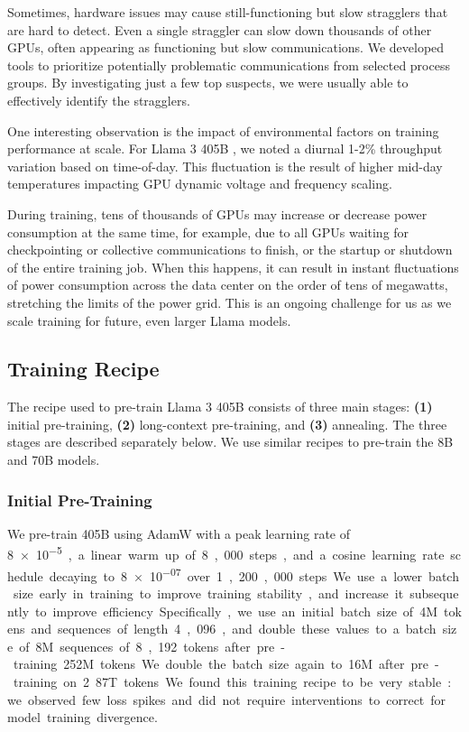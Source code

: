 \documentclass[dvipsnames]{fairmeta}
\begin{document}
Sometimes, hardware issues may cause still-functioning but slow stragglers that are hard to detect. Even a single straggler can slow down thousands of other GPUs, often appearing as functioning but slow communications. We developed tools to prioritize potentially problematic communications from selected process groups. By investigating just a few top suspects,  we were usually able to effectively identify the stragglers.

One interesting observation is the impact of environmental factors on training performance at scale. For Llama 3 405B , we noted a diurnal 1-2\% throughput variation based on time-of-day. This fluctuation is the result of higher mid-day temperatures impacting GPU dynamic voltage and frequency scaling.

During training, tens of thousands of GPUs may increase or decrease power consumption at the same time, for example, due to all GPUs waiting for checkpointing or collective communications to finish, or the startup or shutdown of the entire training job. When this happens, it can result in instant fluctuations of power consumption across the data center on the order of tens of megawatts, stretching the limits of the power grid. This is an ongoing challenge for us as we scale training for future, even larger Llama models.

\subsection{Training Recipe}
\label{section:pretraining_training_recipe}
The recipe used to pre-train Llama 3 405B consists of three main stages: \textbf{(1)} initial pre-training, \textbf{(2)} long-context pre-training, and \textbf{(3)} annealing. 
The three stages are described separately below.
We use similar recipes to pre-train the 8B and 70B models.

\subsubsection{Initial Pre-Training}
We pre-train \llamathree 405B using AdamW with a peak learning rate of \SI{8e-5}, a linear warm up of 8,000 steps, and a cosine learning rate schedule decaying to \SI{8e-07} over 1,200,000 steps.
We use a lower batch size early in training to improve training stability, and increase it subsequently to improve efficiency. 
Specifically, we use an initial batch size of 4M tokens and sequences of length 4,096, and double these values to a batch size of 8M sequences of 8,192 tokens after pre-training 252M tokens.
We double the batch size again to 16M after pre-training on 2.87T tokens.
We found this training recipe to be very stable: we observed few loss spikes and did not require interventions to correct for model training divergence.
\end{document}
